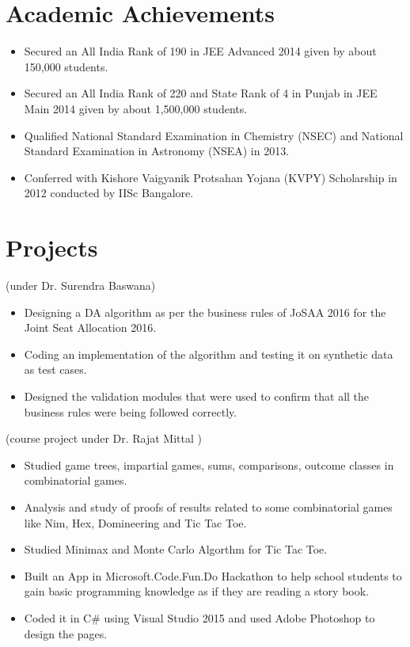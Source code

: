 \documentclass{cv}
\begin{document}
\section*{Academic Achievements}
\begin{itemize}
\item Secured an All India Rank of 190 in JEE Advanced 2014 given by about 150,000 students.
\item Secured an All India Rank of 220 and State Rank of 4 in Punjab in JEE Main 2014 given by about 1,500,000
students.
\item Qualified National Standard Examination in Chemistry (NSEC) and National Standard Examination in Astronomy (NSEA)
in 2013.
\item Conferred with Kishore Vaigyanik Protsahan Yojana (KVPY) Scholarship in 2012 conducted by IISc Bangalore.
\end{itemize}

\section*{Projects}
(under Dr. Surendra Baswana)
\begin{itemize}
\item Designing a DA algorithm as per the business rules of JoSAA 2016 for the Joint Seat Allocation 2016.
\item Coding an implementation of the algorithm and testing it on synthetic data as test cases.
\item Designed the validation modules that were used to confirm that all the business rules were being followed correctly.
\end{itemize}

(course project under Dr. Rajat Mittal )
\begin{itemize}
\item Studied game trees, impartial games, sums, comparisons, outcome classes in combinatorial games.
\item Analysis and study of proofs of results related to some combinatorial games like Nim, Hex, Domineering and
Tic Tac Toe.
\item Studied Minimax and Monte Carlo Algorthm for Tic Tac Toe.
\end{itemize}

\begin{itemize}
\item Built an App in Microsoft.Code.Fun.Do Hackathon to help school students to gain basic programming knowledge
as if they are reading a story book.
\item Coded it in C\# using Visual Studio 2015 and used Adobe Photoshop to design the pages.
\end{itemize}
\end{document}
